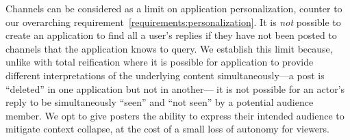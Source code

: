 Channels can be considered as a limit on application personalization,
counter to our overarching requirement~\ref{requirements:personalization}.
It is \emph{not} possible to create an
application to find all a user's replies if they have not been posted to channels that
the application knows to query.
We establish this limit because, unlike with total reification where it is
possible for application to provide different interpretations of the underlying
content simultaneously---a post is ``deleted'' in one application but not in another---%
it is not possible for an actor's reply to be simultaneously ``seen'' and ``not seen''
by a potential audience member.
We opt to give posters the ability to express their intended audience
to mitigate context collapse, at the cost of a small loss of autonomy for viewers.








